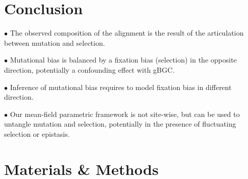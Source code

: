 \section{Conclusion}

$\bullet$ The observed composition of the alignment is the result of the articulation between mutation and selection.

$\bullet$ Mutational bias is balanced by a fixation bias (selection) in the opposite direction, potentially a confounding effect with gBGC.

$\bullet$ Inference of mutational bias requires to model fixation bias in different direction.

$\bullet$ Our mean-field parametric framework is not site-wise, but can be used to untangle mutation and selection, potentially in the presence of fluctuating selection or epistasis.


\section{Materials \& Methods}

